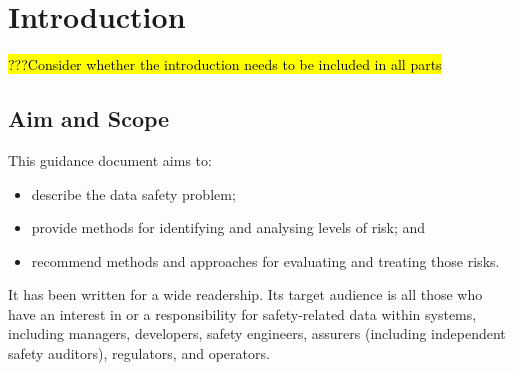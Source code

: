 %
%

%
%
\setcounter{page}{1}
\pagestyle{Standard} %
\thispagestyle{FirstPage}

\chapter{Introduction} \label{bkm:introduction}
\hl{???Consider whether the introduction needs to be included in all parts}

\section{Aim and Scope}
This guidance document aims to:
\begin{itemize}
	\item describe the data safety problem;
	\item provide methods for identifying and analysing levels of risk; and
	\item recommend methods and approaches for evaluating and treating those risks.
\end{itemize}

It has been written for a wide readership. Its target audience is all those who have an interest in or a responsibility for safety-related data within systems, including managers, developers, safety engineers, assurers (including independent safety auditors), regulators, and operators. 

